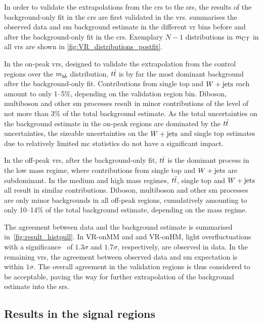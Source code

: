 

In order to validate the extrapolations from the \glspl{cr} to the \glspl{sr}, the results of the background-only fit in the \glspl{cr} are first validated in the \glspl{vr}.  summarises the observed data and \gls{sm} background estimate in the different \gls{vr} bins before and after the background-only fit in the \glspl{cr}. Exemplary $N-1$ distributions in $m_{\textrm{CT}}$ in all \glspl{vr} are shown in \cref{fig:VR_distributions_postfit}.

In the on-peak \glspl{vr}, designed to validate the extrapolation from the control regions over the $m_{b\bar{b}}$ distribution, $t\bar{t}$ is by far the most dominant background after the background-only fit. Contributions from single top and $W+\mathrm{jets}$ each amount to only 1--5\%, depending on the validation region bin. Diboson, multiboson and other \gls{sm} processes result in minor contributions of the level of not more than 3\% of the total background estimate. As the total uncertainties on the background estimate in the on-peak regions are dominated by the $t\bar{t}$ uncertainties, the sizeable uncertainties on the $W+\mathrm{jets}$ and single top estimates due to relatively limited \gls{mc} statistics do not have a significant impact.

In the off-peak \glspl{vr}, after the background-only fit, $t\bar{t}$ is the dominant process in the low mass regime, where contributions from single top and $W+\mathrm{jets}$ are subdominant. In the medium and high mass regimes, $t\bar{t}$, single top and $W+\mathrm{jets}$ all result in similar contributions. Diboson, multiboson and other \gls{sm} processes are only minor backgrounds in all off-peak regions, cumulatively amounting to only 10--14\% of the total background estimate, depending on the mass regime.

The agreement between data and the background estimate is summarised in~\cref{fig:result_histpull}. In \mbox{VR-onMM} and and \mbox{VR-onHM}, light overfluctuations with a significance~\cite{Cousins:2007bmb} of $1.3\sigma$ and $1.7\sigma$, respectively, are observed in data. In the remaining \glspl{vr}, the agreement between observed data and \gls{sm} expectation is within $1\sigma$. The overall agreement in the validation regions is thus considered to be acceptable, paving the way for further extrapolation of the background estimate into the \glspl{sr}.

\subsection{Results in the signal regions}

